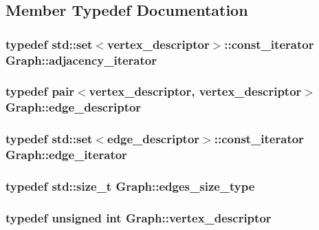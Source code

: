 \subsection{Member Typedef Documentation}
\hypertarget{classGraph_ad03c07358f7be9768eba3825f75ded45}{
\subsubsection[{adjacency\-\_\-iterator}]{\setlength{\rightskip}{0pt plus 5cm}typedef std\-::set$<${\bf vertex\-\_\-descriptor}$>$\-::const\-\_\-iterator {\bf Graph\-::adjacency\-\_\-iterator}}}\label{classGraph_ad03c07358f7be9768eba3825f75ded45}
\hypertarget{classGraph_ab641b227e6d3e56c3340cda156fc2bad}{
\subsubsection[{edge\-\_\-descriptor}]{\setlength{\rightskip}{0pt plus 5cm}typedef pair$<${\bf vertex\-\_\-descriptor}, {\bf vertex\-\_\-descriptor}$>$ {\bf Graph\-::edge\-\_\-descriptor}}}\label{classGraph_ab641b227e6d3e56c3340cda156fc2bad}
\hypertarget{classGraph_a1082e7f0c0beefee6a7950e951a081f6}{
\subsubsection[{edge\-\_\-iterator}]{\setlength{\rightskip}{0pt plus 5cm}typedef std\-::set$<${\bf edge\-\_\-descriptor}$>$\-::const\-\_\-iterator {\bf Graph\-::edge\-\_\-iterator}}}\label{classGraph_a1082e7f0c0beefee6a7950e951a081f6}
\hypertarget{classGraph_a1924745b438f862ba9aa7cd0ff5b7da5}{
\subsubsection[{edges\-\_\-size\-\_\-type}]{\setlength{\rightskip}{0pt plus 5cm}typedef std\-::size\-\_\-t {\bf Graph\-::edges\-\_\-size\-\_\-type}}}\label{classGraph_a1924745b438f862ba9aa7cd0ff5b7da5}
\hypertarget{classGraph_a9b97d75f995b7c1cb0b5760690bef3ba}{
\subsubsection[{vertex\-\_\-descriptor}]{\setlength{\rightskip}{0pt plus 5cm}typedef unsigned int {\bf Graph\-::vertex\-\_\-descriptor}}}\label{classGraph_a9b97d75f995b7c1cb0b5760690bef3ba}
